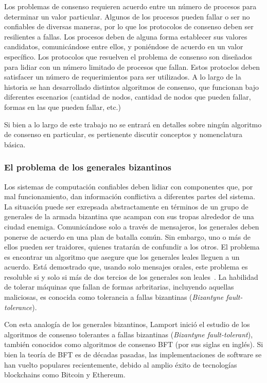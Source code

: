 Los problemas de consenso requieren acuerdo entre un número de procesos para determinar un valor particular.
%
Algunos de los procesos pueden fallar o ser no confiables de diversas maneras, por lo que los protocolos de
consenso deben ser resilientes a fallas.
%
Los procesos deben de alguna forma establecer sus valores candidatos, comunicándose entre ellos, y
poniéndose de acuerdo en un valor específico.
%
Los protocolos que resuelven el problema de consenso son diseñados para lidiar con un número limitado de procesos
que fallan.
%
Estos protoclos deben satisfacer un número de requerimientos para ser utilizados.
%
A lo largo de la historia se han desarrollado distintos algoritmos de consenso, que funcionan bajo diferentes
escenarios (cantidad de nodos, cantidad de nodos que pueden fallar, formas en las que pueden fallar, etc.)

%

Si bien a lo largo de este trabajo no se entrará en detalles sobre ningún algoritmo de consenso en particular,
es pertienente discutir conceptos y nomenclatura básica.

\subsubsection{El problema de los generales bizantinos}

Los sistemas de computación confiables deben lidiar con componentes que, por mal funcionamiento,
dan información conflictiva a diferentes partes del sistema.
La situación puede ser exrepsada abstractamente
en términos de un grupo de generales de la armada bizantina que acampan con sus tropas alrededor de una
ciudad enemiga.
Comunicándose solo a través de mensajeros, los generales deben ponerse de acuerdo en una plan
de batalla común.
Sin embargo, uno o más de ellos pueden ser traidores, quienes tratarán de confundir a los
otros.
El problema es encontrar un algoritmo que asegure que los generales leales lleguen a un acuerdo.
Está demostrado que, usando solo mensajes orales, este problema es resoluble si y solo si más de dos tercios
de los generales son leales~\cite{byzantineproblem}.
La habilidad de tolerar máquinas que fallan de formas arbritarias, incluyendo aquellas maliciosas,
es conocida como tolerancia a fallas bizantinas (\textit{Bizantyne fault-tolerance}).

%

Con esta analogía de los generales bizantinos, Lamport inició el estudio de los algoritmos de consenso tolerantes a fallas
bizantinas (\textit{Bizantyne fault-tolerant}), también conocidos como algoritmos de consenso BFT (por sus siglas en inglés).
Si bien la teoría de
BFT es de décadas pasadas, las implementaciones de software se han vuelto populares recientemente,
debido al amplio éxito de tecnologías blockchains como Bitcoin y Ethereum.

